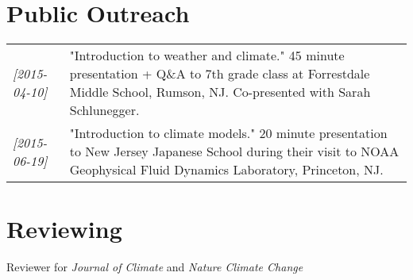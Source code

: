 \documentclass{article}
\begin{document}
\section*{Public Outreach}
\label{sec-6}
\begin{center}
\begin{tabularx}{\textwidth}{lX}
\textit{[2015-04-10]} & "Introduction to weather and climate."  45 minute presentation + Q\&A to 7th grade class at Forrestdale Middle School, Rumson, NJ.  Co-presented with Sarah Schlunegger.\\
\textit{[2015-06-19]} & "Introduction to climate models."  20 minute presentation to New Jersey Japanese School during their visit to NOAA Geophysical Fluid Dynamics Laboratory, Princeton, NJ.\\
\end{tabularx}
\end{center}
\section*{Reviewing}
\label{sec-7}
Reviewer for \emph{Journal of Climate} and \emph{Nature Climate Change}
\end{document}

